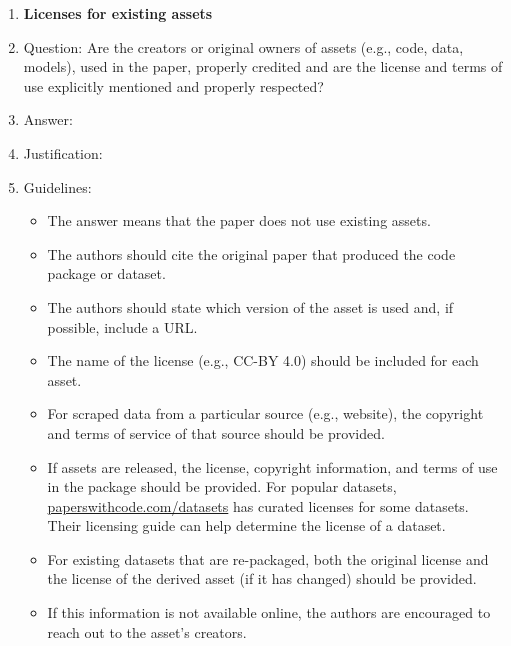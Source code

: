 \documentclass{article}
\begin{document}
\begin{enumerate}
\item {\bf Licenses for existing assets}
    \item[] Question: Are the creators or original owners of assets (e.g., code, data, models), used in the paper, properly credited and are the license and terms of use explicitly mentioned and properly respected?
    \item[] Answer: \answerTODO{} %
    \item[] Justification: \justificationTODO{}
    \item[] Guidelines:
    \begin{itemize}
        \item The answer \answerNA{} means that the paper does not use existing assets.
        \item The authors should cite the original paper that produced the code package or dataset.
        \item The authors should state which version of the asset is used and, if possible, include a URL.
        \item The name of the license (e.g., CC-BY 4.0) should be included for each asset.
        \item For scraped data from a particular source (e.g., website), the copyright and terms of service of that source should be provided.
        \item If assets are released, the license, copyright information, and terms of use in the package should be provided. For popular datasets, \url{paperswithcode.com/datasets} has curated licenses for some datasets. Their licensing guide can help determine the license of a dataset.
        \item For existing datasets that are re-packaged, both the original license and the license of the derived asset (if it has changed) should be provided.
        \item If this information is not available online, the authors are encouraged to reach out to the asset's creators.
    \end{itemize}


\end{enumerate}
\end{document}
